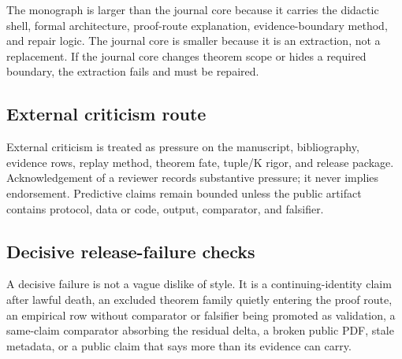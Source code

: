 The monograph is larger than the journal core because it carries the didactic shell, formal architecture, proof-route explanation, evidence-boundary method, and repair logic. The journal core is smaller because it is an extraction, not a replacement. If the journal core changes theorem scope or hides a required boundary, the extraction fails and must be repaired.


\subsection{External criticism route}

External criticism is treated as pressure on the manuscript, bibliography, evidence rows, replay method, theorem fate, tuple/K rigor, and release package. Acknowledgement of a reviewer records substantive pressure; it never implies endorsement. Predictive claims remain bounded unless the public artifact contains protocol, data or code, output, comparator, and falsifier.


\subsection{Decisive release-failure checks}

A decisive failure is not a vague dislike of style. It is a continuing-identity claim after lawful death, an excluded theorem family quietly entering the proof route, an empirical row without comparator or falsifier being promoted as validation, a same-claim comparator absorbing the residual delta, a broken public PDF, stale metadata, or a public claim that says more than its evidence can carry.
